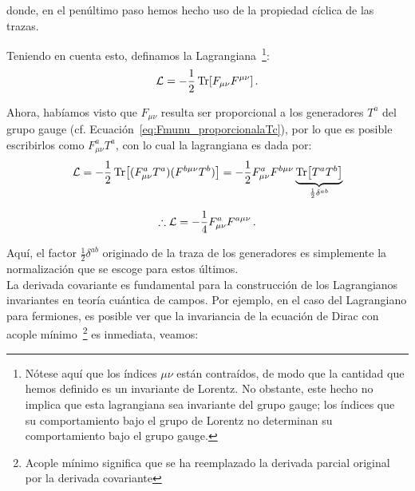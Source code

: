 \noindent donde, en el penúltimo paso hemos hecho uso de la propiedad cíclica de las trazas.

Teniendo en cuenta esto, definamos la Lagrangiana~\footnote{Nótese aquí que los índices $\mu\nu$ están contraídos, de modo que la cantidad que hemos definido es un invariante de Lorentz. No obstante, este hecho no implica que esta lagrangiana sea invariante del grupo gauge; los índices que su comportamiento bajo el grupo de Lorentz no determinan su comportamiento bajo el grupo gauge.}:
%
\begin{equation}
    \mathcal{L} = - \frac{1}{2} \Tr[F_{\mu\nu} F^{\mu\nu}]\,.
\end{equation}

Ahora, habíamos visto que $F_{\mu\nu}$ resulta ser proporcional a los generadores $T^a$ del grupo gauge (cf. Ecuación~\eqref{eq:Fmunu_proporcionalaTc}), por lo que es posible escribirlos como $F^a_{\mu\nu}T^a$, con lo cual la lagrangiana es dada por:
%
\begin{equation*}
    \mathcal{L} = - \frac{1}{2} \Tr[(F_{\mu\nu}^a T^a) (F^{b \mu\nu}T^b)] = -\frac{1}{2} F^a_{\mu\nu} F^{b \mu\nu} \underbrace{\Tr[T^a T^b]}_{\frac{1}{2} \delta^{ab}}
\end{equation*}

\begin{equation}
    \therefore \mathcal{L} = -\frac{1}{4} F_{\mu\nu}^a F^{a \mu\nu} \,.
\end{equation}

Aquí, el factor $\frac{1}{2}\delta^{ab}$ originado de la traza de los generadores es simplemente la normalización que se escoge para estos últimos. \\



La derivada covariante es fundamental para la construcción de los Lagrangianos invariantes en teoría cuántica de campos. Por ejemplo, en el caso del Lagrangiano para fermiones, es posible ver que la invariancia de la ecuación de Dirac con acople mínimo~\footnote{Acople mínimo significa que se ha reemplazado la derivada parcial original por la derivada covariante} es inmediata, veamos:


